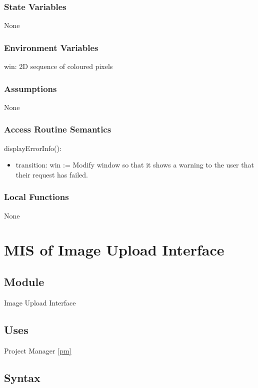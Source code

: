 \documentclass[12pt, titlepage]{article}
\begin{document}
\subsubsection{State Variables}
None
\subsubsection{Environment Variables}
win: 2D sequence of coloured pixels

\subsubsection{Assumptions}
None

\subsubsection{Access Routine Semantics}

\noindent displayErrorInfo():
\begin{itemize}
\item transition: win := Modify window so that it shows a warning to the user that their request has failed.
\end{itemize}

\subsubsection{Local Functions}
None

\section{MIS of Image Upload Interface} \label{iui}

\subsection{Module}

Image Upload Interface

\subsection{Uses}

Project Manager \ref{pm}\\

\subsection{Syntax}
\end{document}
